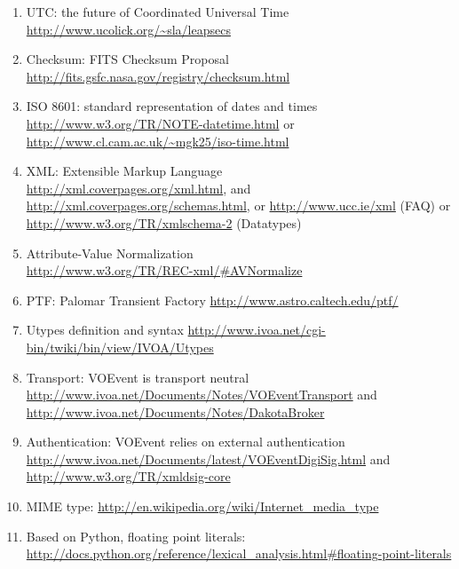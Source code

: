 \documentclass[11pt,a4paper]{ivoa}
\begin{document}
\begin{enumerate}
\item\label{bib26} UTC: the future of Coordinated Universal Time \url{http://www.ucolick.org/~sla/leapsecs}
\item\label{bib27} Checksum: FITS Checksum Proposal \url{http://fits.gsfc.nasa.gov/registry/checksum.html}
\item\label{bib28} ISO 8601: standard representation of dates and times \\
\url{http://www.w3.org/TR/NOTE-datetime.html} or \url{http://www.cl.cam.ac.uk/~mgk25/iso-time.html}
\item\label{bib29} XML: Extensible Markup Language\\
\url{http://xml.coverpages.org/xml.html}, and  \url{http://xml.coverpages.org/schemas.html}, or \url{http://www.ucc.ie/xml} (FAQ) or \url{http://www.w3.org/TR/xmlschema-2} (Datatypes) 
\item\label{bib30} Attribute-Value Normalization\\
\url{http://www.w3.org/TR/REC-xml/#AVNormalize} 
\item\label{bib31} PTF: Palomar Transient Factory \url{http://www.astro.caltech.edu/ptf/}
\item\label{bib32} Utypes definition and syntax \url{http://www.ivoa.net/cgi-bin/twiki/bin/view/IVOA/Utypes}
\item\label{bib33} Transport: VOEvent is transport neutral \\
\url{http://www.ivoa.net/Documents/Notes/VOEventTransport} and \\
\url{http://www.ivoa.net/Documents/Notes/DakotaBroker} 
\item\label{bib34} Authentication: VOEvent relies on external authentication \\
\url{http://www.ivoa.net/Documents/latest/VOEventDigiSig.html}  and \url{http://www.w3.org/TR/xmldsig-core}
\item\label{bib35} MIME type: \url{http://en.wikipedia.org/wiki/Internet_media_type}
\item\label{bib36} Based on Python, floating point literals:\\
\url{http://docs.python.org/reference/lexical_analysis.html#floating-point-literals}
\end{enumerate}
\end{document}
